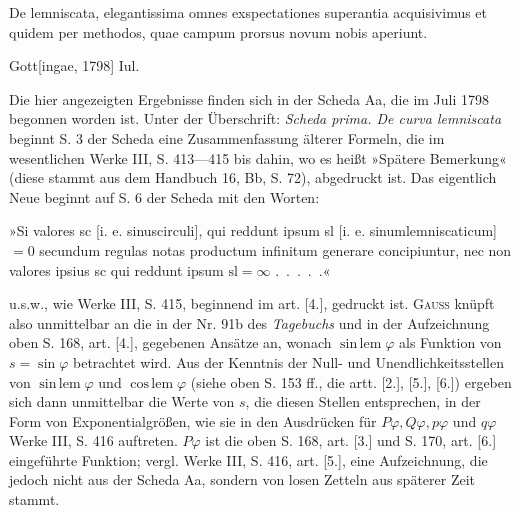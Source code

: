 \clearpage{}
\indent De lemniscata, elegantissima omnes exspectationes superantia acquisivimus et quidem per methodos, quae campum prorsus novum nobis aperiunt.
\par\noindent\hfill Gott[ingae, 1798] Iul.

\medskip\begingroup\small
\indent Die hier angezeigten Ergebnisse finden sich in der Scheda Aa, die im Juli 1798 begonnen worden ist. Unter der Überschrift: \textit{Scheda prima. De curva lemniscata} beginnt S. 3 der Scheda eine Zusammenfassung älterer Formeln, die im wesentlichen Werke III, S. 413—415 bis dahin, wo es heißt »Spätere Bemerkung« (diese stammt aus dem Handbuch 16, Bb, S. 72), abgedruckt ist. Das eigentlich Neue beginnt auf S. 6 der Scheda mit den Worten:
\par\begingroup\normalsize
\indent »Si valores sc [i. e. sinuscirculi], qui reddunt ipsum sl [i. e. sinumlemniscaticum]\(=0\) secundum regulas notas productum infinitum generare concipiuntur, nec non valores ipsius sc qui reddunt ipsum \(\mathrm{sl}=\infty\) .\ .\ .\ .\ .«
\par\endgroup
\noindent u.s.w., wie Werke III, S. 415, beginnend im art. [4.], gedruckt ist. \textsc{Gauss} knüpft also unmittelbar an die in der Nr. 91b des \textit{Tagebuchs} und in der Aufzeichnung oben S. 168, art. [4.], gegebenen Ansätze an, wonach \(\operatorname{sin\,lem}\varphi\) als Funktion von \(s=\sin\varphi\) betrachtet wird. Aus der Kenntnis der Null- und Unendlichkeitsstellen von \(\operatorname{sin\,lem}\varphi\) und \(\operatorname{cos\,lem}\varphi\) (siehe oben S. 153 ff., die artt. [2.], [5.], [6.]) ergeben sich dann unmittelbar die Werte von \(s\), die diesen Stellen entsprechen, in der Form von Exponentialgrößen, wie sie in den Ausdrücken für \(P\varphi,Q\varphi,p\varphi\) und \(q\varphi\) Werke III, S. 416 auftreten. \(P\varphi\) ist die oben S. 168, art. [3.] und S. 170, art. [6.] eingeführte Funktion; vergl. Werke III, S. 416, art. [5.], eine Aufzeichnung, die jedoch nicht aus der Scheda Aa, sondern von losen Zetteln aus späterer Zeit stammt.

